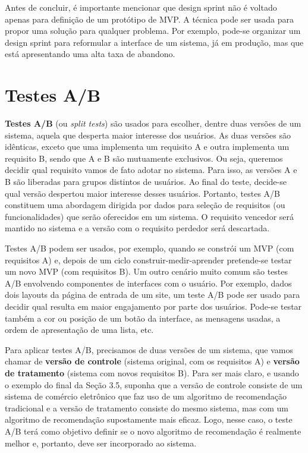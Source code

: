 \documentclass[
  11pt,
  twoside]{book}
\begin{document}
Antes de concluir, é importante mencionar que design sprint não é
voltado apenas para definição de um protótipo de MVP. A técnica pode ser
usada para propor uma solução para qualquer problema. Por exemplo,
pode-se organizar um design sprint para reformular a interface de um
sistema, já em produção, mas que está apresentando uma alta taxa de
abandono.

\hypertarget{testes-ab}{%
\section{Testes A/B}\label{testes-ab}}

 \textbf{Testes A/B} (ou \emph{split tests}) são
usados para escolher, dentre duas versões de um sistema, aquela que
desperta maior interesse dos usuários. As duas versões são idênticas,
exceto que uma implementa um requisito A e outra implementa um requisito
B, sendo que A e B são mutuamente exclusivos. Ou seja, queremos decidir
qual requisito vamos de fato adotar no sistema. Para isso, as versões A
e B são liberadas para grupos distintos de usuários. Ao final do teste,
decide-se qual versão despertou maior interesse desses usuários.
Portanto, testes A/B constituem uma abordagem dirigida por dados para
seleção de requisitos (ou funcionalidades) que serão oferecidos em um
sistema. O requisito vencedor será mantido no sistema e a versão com o
requisito perdedor será descartada.

Testes A/B podem ser usados, por exemplo, quando se constrói um MVP (com
requisitos A) e, depois de um ciclo construir-medir-aprender pretende-se
testar um novo MVP (com requisitos B). Um outro cenário muito comum são
testes A/B envolvendo componentes de interfaces com o usuário. Por
exemplo, dados dois layouts da página de entrada de um site, um teste
A/B pode ser usado para decidir qual resulta em maior engajamento por
parte dos usuários. Pode-se testar também a cor ou posição de um botão
da interface, as mensagens usadas, a ordem de apresentação de uma lista,
etc.

 
 Para aplicar testes A/B,
precisamos de duas versões de um sistema, que vamos chamar de
\textbf{versão de controle} (sistema original, com os requisitos A) e
\textbf{versão de tratamento} (sistema com novos requisitos B). Para ser
mais claro, e usando o exemplo do final da Seção 3.5, suponha que a
versão de controle consiste de um sistema de comércio eletrônico que faz
uso de um algoritmo de recomendação tradicional e a versão de tratamento
consiste do mesmo sistema, mas com um algoritmo de recomendação
supostamente mais eficaz. Logo, nesse caso, o teste A/B terá como
objetivo definir se o novo algoritmo de recomendação é realmente melhor
e, portanto, deve ser incorporado ao sistema.
\end{document}
